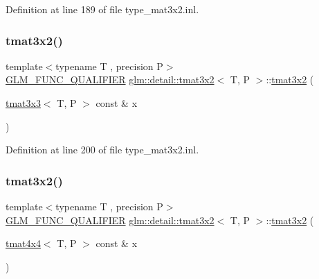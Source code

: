 Definition at line 189 of file type\+\_\+mat3x2.\+inl.

\mbox{\label{structglm_1_1detail_1_1tmat3x2_ade7bd106866ef9d3333332d20a52153e}} 
\subsubsection{\texorpdfstring{tmat3x2()}{tmat3x2()}\hspace{0.1cm}{\footnotesize\ttfamily [12/22]}}
{\footnotesize\ttfamily template$<$typename T , precision P$>$ \\
\hyperlink{setup_8hpp_a33fdea6f91c5f834105f7415e2a64407}{G\+L\+M\+\_\+\+F\+U\+N\+C\+\_\+\+Q\+U\+A\+L\+I\+F\+I\+ER} \hyperlink{structglm_1_1detail_1_1tmat3x2}{glm\+::detail\+::tmat3x2}$<$ T, P $>$\+::\hyperlink{structglm_1_1detail_1_1tmat3x2}{tmat3x2} (\begin{DoxyParamCaption}\item[{\hyperlink{structglm_1_1detail_1_1tmat3x3}{tmat3x3}$<$ T, P $>$ const \&}]{x }\end{DoxyParamCaption})\hspace{0.3cm}{\ttfamily [explicit]}}



Definition at line 200 of file type\+\_\+mat3x2.\+inl.

\mbox{\label{structglm_1_1detail_1_1tmat3x2_a58d20ac5dcb7504ec91670e49e353f7b}} 
\subsubsection{\texorpdfstring{tmat3x2()}{tmat3x2()}\hspace{0.1cm}{\footnotesize\ttfamily [13/22]}}
{\footnotesize\ttfamily template$<$typename T , precision P$>$ \\
\hyperlink{setup_8hpp_a33fdea6f91c5f834105f7415e2a64407}{G\+L\+M\+\_\+\+F\+U\+N\+C\+\_\+\+Q\+U\+A\+L\+I\+F\+I\+ER} \hyperlink{structglm_1_1detail_1_1tmat3x2}{glm\+::detail\+::tmat3x2}$<$ T, P $>$\+::\hyperlink{structglm_1_1detail_1_1tmat3x2}{tmat3x2} (\begin{DoxyParamCaption}\item[{\hyperlink{structglm_1_1detail_1_1tmat4x4}{tmat4x4}$<$ T, P $>$ const \&}]{x }\end{DoxyParamCaption})\hspace{0.3cm}{\ttfamily [explicit]}}



